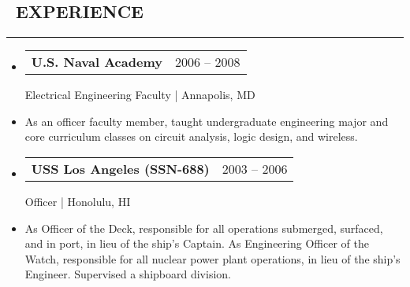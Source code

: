 \documentclass[10pt,letterpaper]{article}
\makeatletter
\newenvironment{resumesection}[1]
{%
    \subsection*{\ \textcolor{light-gray}{#1} }
    \vspace{-0.4em}
    \begin{samepage}
    \hrule
    \end{samepage}
    \vspace{+0.4em}
    \begin{itemize}[leftmargin=0.15cm]
        \parskip=0.1em
}%
{%
    \end{itemize}
}%
\newcommand{\myitem}[1] {
    \item[] \textcolor{dark-gray}{#1}
}
\newcommand{\headertri}[3] {
    \item[] \begin{tabular*}{\linewidth}{l@{\extracolsep{\fill}}r}
    \textbf{#1} & #2 \\
    \end{tabular*}
    #3
}
\newcommand{\rminiw}{0.550}
\makeatother
\begin{document}
\begin{minipage}[t]{\rminiw\textwidth}
\begin{resumesection}{EXPERIENCE}
    \headertri
    {U.S. Naval Academy}
    {2006 -- 2008}
    {Electrical Engineering Faculty | Annapolis, MD}
    \myitem{
        As an officer faculty member, taught undergraduate engineering major and core curriculum classes on
        circuit analysis, logic design, and wireless.
    }
    
    
    \headertri
    {USS Los Angeles (SSN-688)}
    {2003 -- 2006}
    {Officer | Honolulu, HI}
    \myitem{As Officer of the Deck, responsible for all operations submerged, surfaced, and in port, in lieu of the ship's Captain.
            As Engineering Officer of the Watch, responsible for all nuclear power plant operations, in lieu of the ship's Engineer.
            Supervised a shipboard division.}
    
    
\end{resumesection}

\end{minipage}

\newpage
\end{document}
